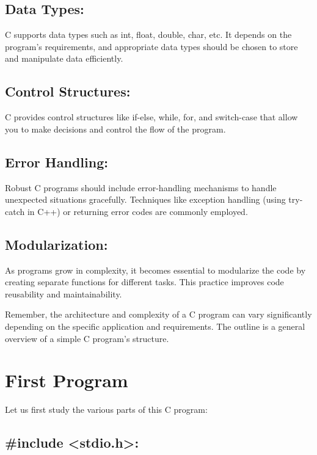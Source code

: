\subsection{Data Types:}
C supports data types such as int, float, double, char, etc. It depends on the program's requirements, and appropriate data types should be chosen to store and manipulate data efficiently.

\subsection{Control Structures:}
C provides control structures like if-else, while, for, and switch-case that allow you to make decisions and control the flow of the program.

\subsection{Error Handling:}
Robust C programs should include error-handling mechanisms to handle unexpected situations gracefully. Techniques like exception handling (using try-catch in C++) or returning error codes are commonly employed.

\subsection{Modularization:}
As programs grow in complexity, it becomes essential to modularize the code by creating separate functions for different tasks. This practice improves code reusability and maintainability.

Remember, the architecture and complexity of a C program can vary significantly depending on the specific application and requirements. The outline is a general overview of a simple C program's structure.


\section{First Program}




Let us first study the various parts of this C program:

\subsection{\#include <stdio.h>:}

